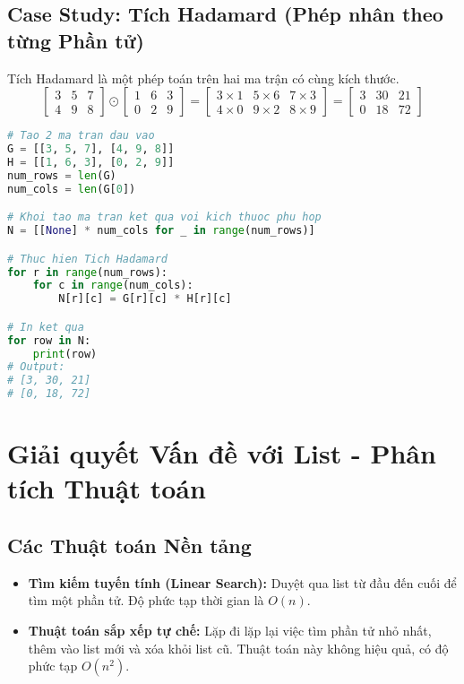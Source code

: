 \documentclass[11pt]{article}
\begin{document}
\subsection{Case Study: Tích Hadamard (Phép nhân theo từng Phần tử)}
Tích Hadamard là một phép toán trên hai ma trận có cùng kích thước.
\[
\begin{bmatrix} 3 & 5 & 7 \\ 4 & 9 & 8 \end{bmatrix} \odot \begin{bmatrix} 1 & 6 & 3 \\ 0 & 2 & 9 \end{bmatrix} = \begin{bmatrix} 3 \times 1 & 5 \times 6 & 7 \times 3 \\ 4 \times 0 & 9 \times 2 & 8 \times 9 \end{bmatrix} = \begin{bmatrix} 3 & 30 & 21 \\ 0 & 18 & 72 \end{bmatrix}
\]
\begin{lstlisting}[language=Python]
# Tao 2 ma tran dau vao
G = [[3, 5, 7], [4, 9, 8]]
H = [[1, 6, 3], [0, 2, 9]]
num_rows = len(G)
num_cols = len(G[0])

# Khoi tao ma tran ket qua voi kich thuoc phu hop
N = [[None] * num_cols for _ in range(num_rows)]

# Thuc hien Tich Hadamard
for r in range(num_rows):
    for c in range(num_cols):
        N[r][c] = G[r][c] * H[r][c]

# In ket qua
for row in N:
    print(row)
# Output:
# [3, 30, 21]
# [0, 18, 72]
\end{lstlisting}

\section{Giải quyết Vấn đề với List - Phân tích Thuật toán}
\subsection{Các Thuật toán Nền tảng}
\begin{itemize}
    \item \textbf{Tìm kiếm tuyến tính (Linear Search):} Duyệt qua list từ đầu đến cuối để tìm một phần tử. Độ phức tạp thời gian là $O(n)$.
    \item \textbf{Thuật toán sắp xếp tự chế:} Lặp đi lặp lại việc tìm phần tử nhỏ nhất, thêm vào list mới và xóa khỏi list cũ. Thuật toán này không hiệu quả, có độ phức tạp $O(n^2)$.
\end{itemize}
\end{document}
